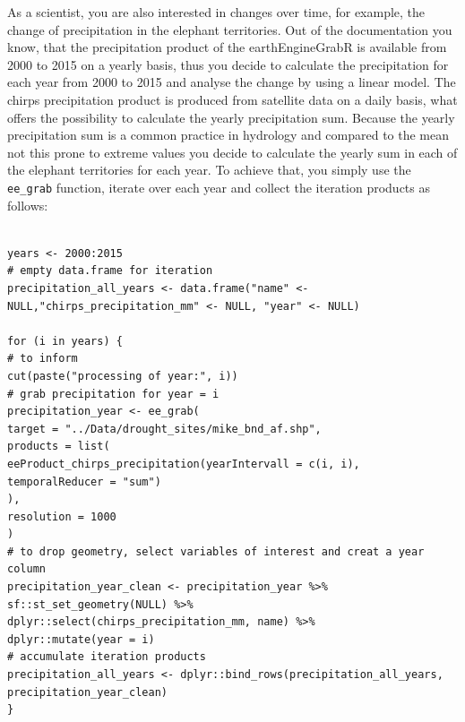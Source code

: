 As a scientist, you are also interested in changes over time, for example, the change of precipitation in the elephant territories. Out of the documentation you know, that the precipitation product of the earthEngineGrabR is available from 2000 to 2015 on a yearly basis, thus you decide to calculate the precipitation for each year from 2000 to 2015 and analyse the change by using a linear model. The chirps precipitation product is produced from satellite data on a daily basis, what offers the possibility to calculate the yearly precipitation sum. Because the yearly precipitation sum is a common practice in hydrology and compared to the mean not this prone to extreme values you decide to calculate the yearly sum in each of the elephant territories for each year. To achieve that, you simply use the \texttt{ee\_grab} function, iterate over each year and collect the iteration products as follows:

\begin{lstlisting}

years <- 2000:2015
# empty data.frame for iteration
precipitation_all_years <- data.frame("name" <- NULL,"chirps_precipitation_mm" <- NULL, "year" <- NULL)

for (i in years) {
# to inform
cut(paste("processing of year:", i))
# grab precipitation for year = i
precipitation_year <- ee_grab(
target = "../Data/drought_sites/mike_bnd_af.shp",
products = list(
eeProduct_chirps_precipitation(yearIntervall = c(i, i), temporalReducer = "sum")
),
resolution = 1000
)
# to drop geometry, select variables of interest and creat a year column
precipitation_year_clean <- precipitation_year %>% 
sf::st_set_geometry(NULL) %>% 
dplyr::select(chirps_precipitation_mm, name) %>% 
dplyr::mutate(year = i)
# accumulate iteration products
precipitation_all_years <- dplyr::bind_rows(precipitation_all_years, precipitation_year_clean)
}
\end{lstlisting}




